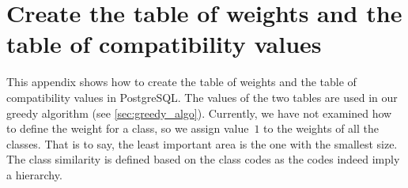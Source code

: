 \documentclass[twocolumn]{svjour3}          %
\begin{document}


%
%



\onecolumn
\appendix

\section{Create the table of weights and the table of compatibility values}
\label{appx:create_tables}
This appendix shows how to create the table of weights and 
the table of compatibility values in PostgreSQL.
The values of the two tables are used in our greedy algorithm
(see \sect\ref{sec:greedy_algo}).
Currently, we have not examined 
how to define the weight for a class,
so we assign value~$1$ to the weights of all the classes.
That is to say, the least important area is the one with the smallest size.
The class similarity is defined based on the class codes 
as the codes indeed imply a hierarchy.

\bigskip


\end{document}
